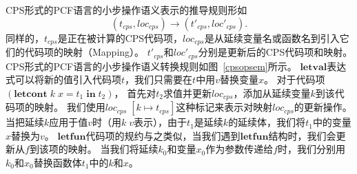 CPS形式的PCF语言的小步操作语义表示的推导规则形如
\begin{equation}
(t_{cps},loc_{cps})\rightarrow(t'_{cps},loc'_{cps}).
\end{equation}
同样的，$t_{cps}$是正在被计算的CPS代码项，$loc_{cps}$是从延续变量名或函数名到引入它们的代码项的映射（Mapping）。
$t'_{cps}$和$loc'_{cps}$分别是更新后的CPS代码项和映射。
CPS形式的PCF语言的小步操作语义转换规则如图~\ref{cpsopsem}所示。
$\mathbf{letval}$表达式可以将新的值引入代码项$t$，我们只需要在$t$中用$v$替换变量$x$。
对于代码项$(\mathbf{letcont}\; k\; x=t_1\; \mathbf{in}\; t_2)$，
首先对$t_2$求值并更新$loc_{cps}$，添加从延续变量$k$到该代码项的映射。
我们使用$loc_{cps}\; [k\mapsto t_{cps}]$这种标记来表示对映射$loc_{cps}$的更新操作。
当把延续$k$应用于值$v$时（用$k\; v$表示），由于$t_1$是延续$k$的延续体，我们将$t_1$中的变量$x$替换为$v$。
$\mathbf{letfun}$代码项的规约与之类似，当我们遇到$\mathbf{letfun}$结构时，我们会更新从$f$到该项的映射。
当我们将延续$k_0$和变量$x_0$作为参数传递给$f$时，我们分别用$k_0$和$x_0$替换函数体$t_1$中的$k$和$x$。

